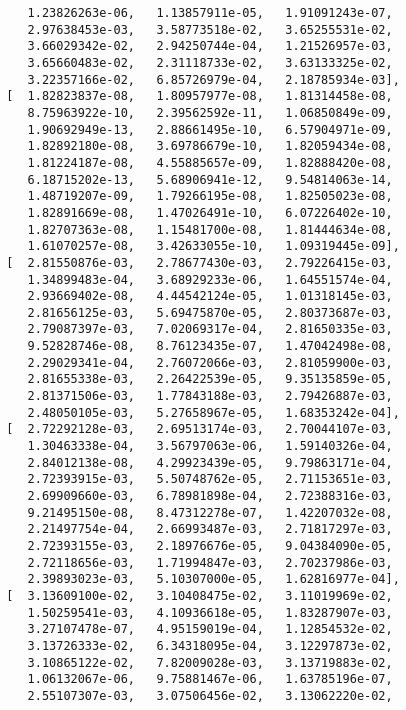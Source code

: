 \documentclass[11pt,a4j,fleqn]{jarticle}
\begin{document}
\begin{verbatim}
          1.23826263e-06,   1.13857911e-05,   1.91091243e-07,
          2.97638453e-03,   3.58773518e-02,   3.65255531e-02,
          3.66029342e-02,   2.94250744e-04,   1.21526957e-03,
          3.65660483e-02,   2.31118733e-02,   3.63133325e-02,
          3.22357166e-02,   6.85726979e-04,   2.18785934e-03],
       [  1.82823837e-08,   1.80957977e-08,   1.81314458e-08,
          8.75963922e-10,   2.39562592e-11,   1.06850849e-09,
          1.90692949e-13,   2.88661495e-10,   6.57904971e-09,
          1.82892180e-08,   3.69786679e-10,   1.82059434e-08,
          1.81224187e-08,   4.55885657e-09,   1.82888420e-08,
          6.18715202e-13,   5.68906941e-12,   9.54814063e-14,
          1.48719207e-09,   1.79266195e-08,   1.82505023e-08,
          1.82891669e-08,   1.47026491e-10,   6.07226402e-10,
          1.82707363e-08,   1.15481700e-08,   1.81444634e-08,
          1.61070257e-08,   3.42633055e-10,   1.09319445e-09],
       [  2.81550876e-03,   2.78677430e-03,   2.79226415e-03,
          1.34899483e-04,   3.68929233e-06,   1.64551574e-04,
          2.93669402e-08,   4.44542124e-05,   1.01318145e-03,
          2.81656125e-03,   5.69475870e-05,   2.80373687e-03,
          2.79087397e-03,   7.02069317e-04,   2.81650335e-03,
          9.52828746e-08,   8.76123435e-07,   1.47042498e-08,
          2.29029341e-04,   2.76072066e-03,   2.81059900e-03,
          2.81655338e-03,   2.26422539e-05,   9.35135859e-05,
          2.81371506e-03,   1.77843188e-03,   2.79426887e-03,
          2.48050105e-03,   5.27658967e-05,   1.68353242e-04],
       [  2.72292128e-03,   2.69513174e-03,   2.70044107e-03,
          1.30463338e-04,   3.56797063e-06,   1.59140326e-04,
          2.84012138e-08,   4.29923439e-05,   9.79863171e-04,
          2.72393915e-03,   5.50748762e-05,   2.71153651e-03,
          2.69909660e-03,   6.78981898e-04,   2.72388316e-03,
          9.21495150e-08,   8.47312278e-07,   1.42207032e-08,
          2.21497754e-04,   2.66993487e-03,   2.71817297e-03,
          2.72393155e-03,   2.18976676e-05,   9.04384090e-05,
          2.72118656e-03,   1.71994847e-03,   2.70237986e-03,
          2.39893023e-03,   5.10307000e-05,   1.62816977e-04],
       [  3.13609100e-02,   3.10408475e-02,   3.11019969e-02,
          1.50259541e-03,   4.10936618e-05,   1.83287907e-03,
          3.27107478e-07,   4.95159019e-04,   1.12854532e-02,
          3.13726333e-02,   6.34318095e-04,   3.12297873e-02,
          3.10865122e-02,   7.82009028e-03,   3.13719883e-02,
          1.06132067e-06,   9.75881467e-06,   1.63785196e-07,
          2.55107307e-03,   3.07506456e-02,   3.13062220e-02,

\end{verbatim}
\end{document}
